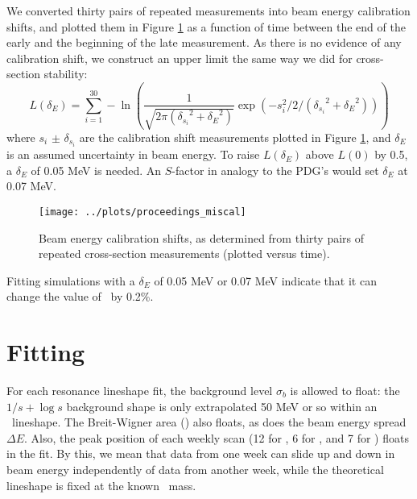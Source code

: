 \documentclass[aps,prd,preprint,superscriptaddress,tightenlines,nofootinbib,floatfix]{revtex4}
\begin{document}
We converted thirty pairs of repeated measurements into beam energy
calibration shifts, and plotted them in Figure \ref{fig:miscal} as a
function of time between the end of the early and the beginning of the
late measurement.  As there is no evidence of any calibration shift,
we construct an upper limit the same way we did for cross-section
stability:
\begin{equation}
  L(\delta_E) = \sum_{i=1}^{30} -\ln \left(\frac{1}
  {\sqrt{2\pi ({\delta_{s_i}}^2 + {\delta_E}^2)}} \exp\left(
  -s_i^2 / 2 / ({\delta_{s_i}}^2 + {\delta_E}^2) \right) \right)
\end{equation}
where $s_i$ $\pm$ $\delta_{s_i}$ are the calibration shift
measurements plotted in Figure \ref{fig:miscal}, and $\delta_E$ is an
assumed uncertainty in beam energy.  To raise $L(\delta_E)$ above
$L(0)$ by 0.5, a $\delta_E$ of 0.05 MeV is needed.  An $S$-factor in
analogy to the PDG's would set $\delta_E$ at 0.07 MeV.

\begin{figure}[t]
  \begin{center}
    \texttt{[image: ../plots/proceedings\_miscal]}
  \end{center}
  \caption{\label{fig:miscal} Beam energy calibration shifts, as
    determined from thirty pairs of repeated cross-section
    measurements (plotted versus time).}
\end{figure}

Fitting simulations with a $\delta_E$ of 0.05 MeV or 0.07 MeV indicate
that it can change the value of \gee\ by 0.2\%.

%
\section{Fitting}
%

For each resonance lineshape fit, the background level $\sigma_b$ is
allowed to float: the $1/s + \log s$ background shape is only
extrapolated 50 MeV or so within an \ups\ lineshape.  The Breit-Wigner
area (\gee) also floats, as does the beam energy spread $\Delta E$.
Also, the peak position of each weekly scan (12 for \uone, 6 for \utwo, and
7 for \uthree) floats in the fit.  By this, we mean that data
from one week can slide up and down in beam energy independently of
data from another week, while the theoretical lineshape is fixed at
the known \ups\ mass.
\end{document}
